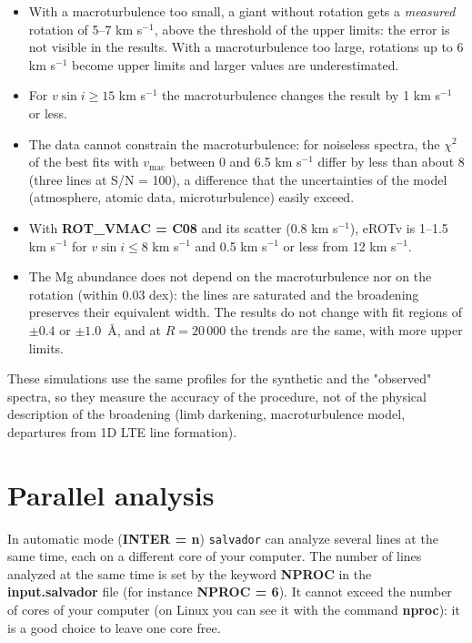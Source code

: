 \documentclass[modern]{aastex701}
\begin{document}
\begin{itemize}
    \item With a macroturbulence too small, a giant without rotation gets a {\it measured} rotation of 5--7 km s$^{-1}$, above the threshold of the upper limits: the error is not visible in the results. With a macroturbulence too large, rotations up to 6 km s$^{-1}$ become upper limits and larger values are underestimated.
    \item For $v \sin i \geq 15$ km s$^{-1}$ the macroturbulence changes the result by 1 km s$^{-1}$ or less.
    \item The data cannot constrain the macroturbulence: for noiseless spectra, the $\chi^2$ of the best fits with $v_{\mathrm{mac}}$ between 0 and 6.5 km s$^{-1}$ differ by less than about 8 (three lines at S/N = 100), a difference that the uncertainties of the model (atmosphere, atomic data, microturbulence) easily exceed.
    \item With {\bf ROT\_VMAC = C08} and its scatter (0.8 km s$^{-1}$), eROTv is 1--1.5 km s$^{-1}$ for $v \sin i \leq 8$ km s$^{-1}$ and 0.5 km s$^{-1}$ or less from 12 km s$^{-1}$.
    \item The Mg abundance does not depend on the macroturbulence nor on the rotation (within 0.03 dex): the lines are saturated and the broadening preserves their equivalent width. The results do not change with fit regions of $\pm 0.4$ or $\pm 1.0$~\AA, and at $R = 20\,000$ the trends are the same, with more upper limits.
\end{itemize}

These simulations use the same profiles for the synthetic and the "observed" spectra, so they measure the accuracy of the procedure, not of the physical description of the broadening (limb darkening, macroturbulence model, departures from 1D LTE line formation).

\section{Parallel analysis} \label{sect:parallel}
\hrulefill

In automatic mode ({\bf INTER = n}) \texttt{salvador} can analyze several lines at the same time, each on a different core of your computer. The number of lines analyzed at the same time is set by the keyword {\bf NPROC} in the {\bf input.salvador} file (for instance {\bf NPROC = 6}). It cannot exceed the number of cores of your computer (on Linux you can see it with the command {\bf nproc}): it is a good choice to leave one core free. 
\end{document}
